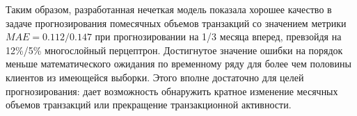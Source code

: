 Таким образом, разработанная нечеткая модель показала хорошее качество в задаче прогнозирования помесячных объемов транзакций со значением метрики $MAE = 0.112/0.147$ при прогнозировании на 1/3 месяца вперед, превзойдя на 12\%/5\% многослойный перцептрон. Достигнутое значение ошибки на порядок меньше математического ожидания по временному ряду для более чем половины клиентов из имеющейся выборки. Этого вполне достаточно для целей прогнозирования: дает возможность обнаружить кратное изменение месячных объемов транзакций или прекращение транзакционной активности.